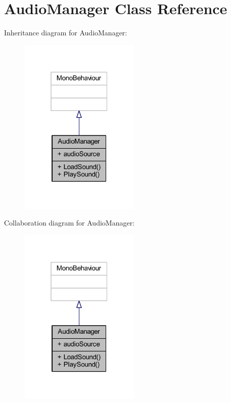 \hypertarget{class_audio_manager}{}\section{Audio\+Manager Class Reference}
\label{class_audio_manager}


Inheritance diagram for Audio\+Manager\+:\nopagebreak
\begin{figure}[H]
\begin{center}
\leavevmode
\includegraphics[width=163pt]{class_audio_manager__inherit__graph}
\end{center}
\end{figure}


Collaboration diagram for Audio\+Manager\+:\nopagebreak
\begin{figure}[H]
\begin{center}
\leavevmode
\includegraphics[width=163pt]{class_audio_manager__coll__graph}
\end{center}
\end{figure}

